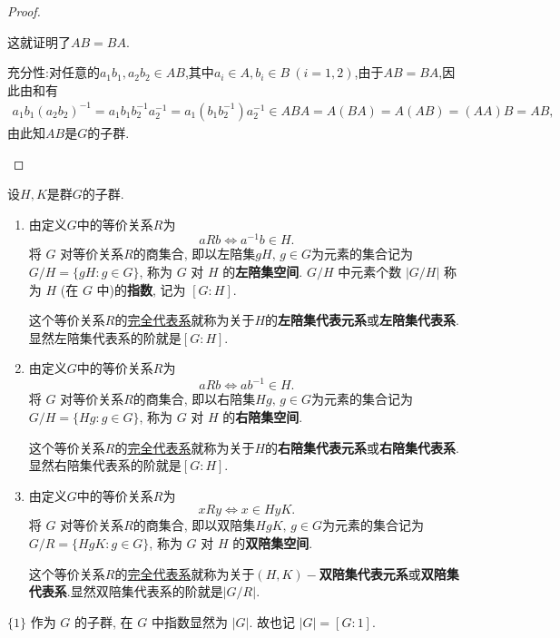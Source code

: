 \documentclass[../../main.tex]{subfiles}%
\begin{document}
\begin{proof}
\begin{enumerate}[(1)]
这就证明了$AB=BA$.

{\heiti 充分性:}对任意的$a_1b_1,a_2b_2\in AB$,其中$a_i\in A,b_i\in B\ (i=1,2)$,由于$AB=BA$,因此由和有
\begin{align*}
a_1b_1(a_2b_2)^{-1}=a_1b_1b_2^{-1}a_2^{-1}=a_1(b_1b_2^{-1})a_2^{-1}\in ABA=A(BA)=A(AB)=(AA)B=AB,
\end{align*}
由此知$AB$是$G$的子群.
\end{enumerate}
\end{proof}

\begin{definition}
设$H,K$是群$G$的子群.
\begin{enumerate}[(1)]
\item 由定义$G$中的等价关系$R$为
\[
aRb \iff a^{-1}b \in H.
\]
将 \( G \) 对等价关系$R$的商集合, 即以左陪集$gH,\,g\in G$为元素的集合记为 \( G/H=\{gH:g\in G\} \), 称为 \( G \) 对 \( H \) 的\textbf{左陪集空间}. \( G/H \) 中元素个数 \( |G/H| \) 称为 \( H \) (在 \( G \) 中)的\textbf{指数}, 记为 \( [G:H] \). 

这个等价关系$R$的\hyperref[Set Theory-definition:等价类的完全代表系]{完全代表系}就称为关于$H$的\textbf{左陪集代表元系}或\textbf{左陪集代表系}.显然左陪集代表系的阶就是\( [G:H] \). 

\item 由定义$G$中的等价关系$R$为
\[
aRb \iff ab^{-1} \in H.
\]
将 \( G \) 对等价关系$R$的商集合, 即以右陪集$Hg,\,g\in G$为元素的集合记为 \( G/H=\{Hg:g\in G\} \), 称为 \( G \) 对 \( H \) 的\textbf{右陪集空间}. 

这个等价关系$R$的\hyperref[Set Theory-definition:等价类的完全代表系]{完全代表系}就称为关于$H$的\textbf{右陪集代表元系}或\textbf{右陪集代表系}.显然右陪集代表系的阶就是\( [G:H] \). 

\item 由定义$G$中的等价关系$R$为
\[
xRy \iff x\in HyK.
\]
将 \( G \) 对等价关系$R$的商集合, 即以双陪集$HgK,\,g\in G$为元素的集合记为 \( G/R=\{HgK:g\in G\} \), 称为 \( G \) 对 \( H \) 的\textbf{双陪集空间}. 

这个等价关系$R$的\hyperref[Set Theory-definition:等价类的完全代表系]{完全代表系}就称为关于$(H,K)-$\textbf{双陪集代表元系}或\textbf{双陪集代表系}.显然双陪集代表系的阶就是\( |G/R| \). 
\end{enumerate}
\end{definition}
\begin{remark}
\(\{1\}\) 作为 \( G \) 的子群, 在 \( G \) 中指数显然为 \( |G| \). 故也记 \( |G| = [G: 1] \).
\end{remark}
\end{document}
